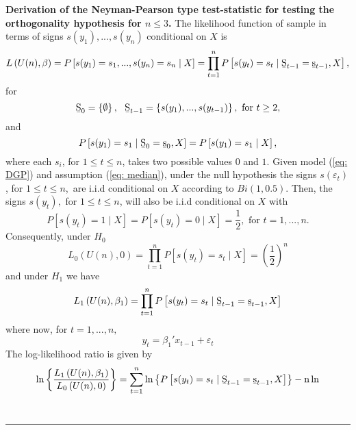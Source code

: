 \documentclass[harvard,11pt]{article}
\newenvironment{proof}[1][Proof]{\textbf{#1.} }{\  \rule{0.5em}{0.5em}}
\begin{document}
\begin{proof}[Derivation of the Neyman-Pearson type test-statistic for testing the orthogonality hypothesis for $n\leq 3$]
The likelihood function of sample in terms of signs $s(y_{1}),...,s(y_{n})$ conditional on $X$ is
\begin{equation*}
L\left( U(n),\beta \right) =P\left[
s(y_{1})=s_{1},...,s(y_{n})=s_{n}\mid X\right] =\prod\limits_{t=1}^{n}%
P\left[ s(y_{t})=s_{t}\mid \text{\b{S}}_{t-1}=\text{\b{s}}_{t-1},X\right] ,
\end{equation*}%
for 
\begin{equation*}
\text{\b{S}}_{0}=\left\{ \emptyset \right\} ,\text{ \ \b{S}}_{t-1}=\left\{
s(y_{1}),...,s(y_{t-1})\right\} ,\text{ for }t\geq 2,
\end{equation*}%
and%
\begin{equation*}
P\left[ s(y_{1})=s_{1}\mid \text{\b{S}}_{0}=\text{\b{s}}_{0},X\right] =P%
\left[s(y_{1})=s_{1}\mid X\right] ,
\end{equation*}%
where each $s_{i}$, for $1\leq t\leq n$, takes two possible values $0$ and $%
1 $. Given model (\ref{eq: DGP}) and assumption (\ref{eq: median}), under the null hypothesis the signs $s(\varepsilon_{t})$, for $1\leq t\leq n$,\ are i.i.d conditional on $X$ according to $Bi(1,0.5)$. Then, the signs $s(y_{t}),$ for $1\leq t\leq n$, will also be i.i.d conditional on $X$
with%
\begin{equation*}
P\left[ s(y_{t})=1\mid X\right] =P\left[ s(y_{t})=0\mid X\right] =%
\frac{1}{2},\text{ for }t=1,...,n.
\end{equation*}%
Consequently, under $H_{0}$%
\begin{equation*}
L_{0}\left( U(n),0\right) =\prod\limits_{t=1}^{n}
P\left[ s(y_{t})=s_{t}\mid X\right] =\left( \frac{1}{2}\right) ^{n}
\end{equation*}%
and under $H_1$ we have%
\begin{equation*}
L_1\left( U(n),\beta _{1}\right) =\prod\limits_{t=1}^{n}%
P\left[ s(y_{t})=s_{t}\mid \text{\b{S}}_{t-1}=\text{\b{s}}_{t-1}, X\right]
\end{equation*}%
where now, for $t=1,...,n,$%
\begin{equation*}
y_{t}=\beta_1'x_{t-1}+\varepsilon_{t}
\end{equation*}%
The log-likelihood ratio is given by%
\begin{equation*}
\ln \left\{ \frac{L_1\left( U(n),\beta _{1}\right) }{L
_{0}\left( U(n),0\right) }\right\} =\sum\limits_{t=1}^{n}\ln \left\{
P\left[ s(y_{t})=s_{t}\mid \text{\b{S}}_{t-1}=\text{\b{s}}_{t-1},X\right] \right\} -\text{n}\ln

\end{equation*}
\end{proof}
\end{document}
